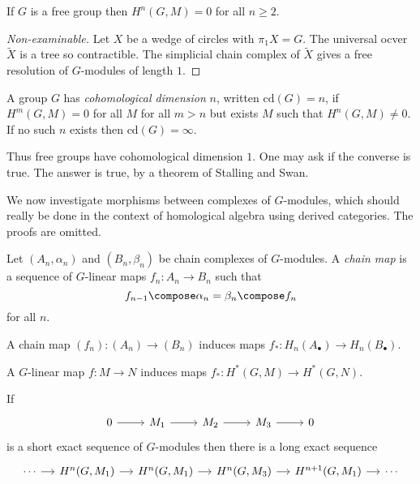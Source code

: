 \documentclass[a4paper]{article}
\begin{document}
\begin{proposition}
  If \(G\) is a free group then \(H^n(G, M) = 0\) for all \(n \geq 2\).
\end{proposition}

\begin{proof}[Non-examinable]
  Let \(X\) be a wedge of circles with \(\pi_1 X = G\). The universal ocver \(\widetilde X\) is a tree so contractible. The simplicial chain complex of \(\widetilde X\) gives a free resolution of \(G\)-modules of length \(1\).
\end{proof}

\begin{definition}
  A group \(G\) has \emph{cohomological dimension} \(n\), written \(\mathrm{cd}(G) = n\), if \(H^m(G, M) = 0\) for all \(M\) for all \(m > n\) but exists \(M\) such that \(H^n(G, M) \ne 0\). If no such \(n\) exists then \(\mathrm{cd}(G) = \infty\).
\end{definition}

Thus free groups have cohomological dimension \(1\). One may ask if the converse is true. The answer is true, by a theorem of Stalling and Swan.

We now investigate morphisms between complexes of \(G\)-modules, which should really be done in the context of homological algebra using derived categories. The proofs are omitted.

\begin{definition}
  Let \((A_n, \alpha_n)\) and \((B_n, \beta_n)\) be chain complexes of \(G\)-modules. A \emph{chain map} is a sequence of \(G\)-linear maps \(f_n: A_n \to B_n\) such that
  \[
    f_{n - 1} \compose \alpha_n = \beta_n \compose f_n
  \]
  for all \(n\).
\end{definition}

\begin{proposition}
  A chain map \((f_n): (A_n) \to (B_n)\) induces maps \(f_*: H_n(A_\bullet) \to H_n(B_\bullet)\).
\end{proposition}

\begin{corollary}
  A \(G\)-linear map \(f: M \to N\) induces maps \(f_*: H^*(G, M) \to H^*(G, N)\).
\end{corollary}

\begin{proposition}
  If
  \[
    \begin{tikzcd}
      0 \ar[r] & M_1 \ar[r] & M_2 \ar[r] & M_3 \ar[r] & 0
    \end{tikzcd}
  \]
  is a short exact sequence of \(G\)-modules then there is a long exact sequence
  \[
    \begin{tikzcd}[column sep=small]
      \cdots \ar[r] & H^n(G, M_1) \ar[r] & H^n(G, M_1) \ar[r] & H^n(G, M_3) \ar[r] & H^{n + 1}(G, M_1) \ar[r] & \cdots
    \end{tikzcd}
  \]
\end{proposition}
\end{document}
